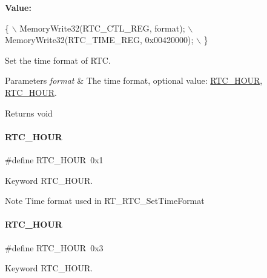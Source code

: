 {\bfseries Value\+:}
\begin{DoxyCode}
\{                                            \(\backslash\)
        MemoryWrite32(RTC\_CTL\_REG, format);      \(\backslash\)
        MemoryWrite32(RTC\_TIME\_REG, 0x00420000); \(\backslash\)
    \}
\end{DoxyCode}


Set the time format of R\+TC. 


\begin{DoxyParams}{Parameters}
{\em format} & The time format, optional value\+: \mbox{\hyperlink{a00053_a6023ebffc90fff4ba8131242c8f4e1ed}{R\+T\+C\+\_\+H\+O\+UR}}, \mbox{\hyperlink{a00053_a4bb66ada65a9c9df51dd50402f75e35e}{R\+T\+C\+\_\+H\+O\+UR}}. \\
\hline
\end{DoxyParams}
\begin{DoxyReturn}{Returns}
void 
\end{DoxyReturn}
\mbox{\label{a00053_a6023ebffc90fff4ba8131242c8f4e1ed}} 
\paragraph{\texorpdfstring{R\+T\+C\+\_\+H\+O\+UR}{RTC\_12HOUR}}
{\footnotesize\ttfamily \#define R\+T\+C\+\_\+H\+O\+UR~0x1}



Keyword R\+T\+C\+\_\+H\+O\+UR. 

\begin{DoxyNote}{Note}
Time format used in R\+T\+\_\+\+R\+T\+C\+\_\+\+Set\+Time\+Format 
\end{DoxyNote}
\mbox{\label{a00053_a4bb66ada65a9c9df51dd50402f75e35e}} 
\paragraph{\texorpdfstring{R\+T\+C\+\_\+H\+O\+UR}{RTC\_24HOUR}}
{\footnotesize\ttfamily \#define R\+T\+C\+\_\+H\+O\+UR~0x3}



Keyword R\+T\+C\+\_\+H\+O\+UR. 

